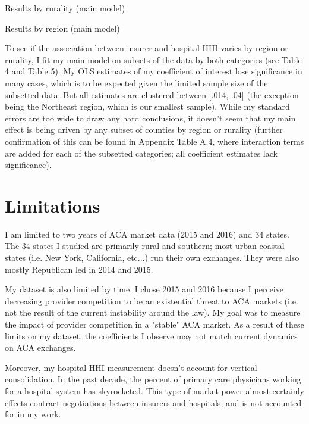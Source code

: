 \documentclass[12pt,letterpaper]{article}
\begin{document}

\begin{table}
\centering
\caption{Results by rurality (main model)}

\end{table}

\begin{table}
\centering
\caption{Results by region (main model)}

\end{table}

\restoregeometry

To see if the association between insurer and hospital HHI varies by region or rurality, I fit my main model on subsets of the data by both categories (see Table 4 and Table 5). My OLS estimates of my coefficient of interest lose significance in many cases, which is to be expected given the limited sample size of the subsetted data. But all estimates are clustered between [.014, .04] (the exception being the Northeast region, which is our smallest sample). While my standard errors are too wide to draw any hard conclusions, it doesn't seem that my main effect is being driven by any subset of counties by region or rurality (further confirmation of this can be found in Appendix Table A.4, where interaction terms are added for each of the subsetted categories; all coefficient estimates lack significance).   

\section{Limitations}

I am limited to two years of ACA market data (2015 and 2016) and 34 states. The 34 states I studied are primarily rural and southern; most urban coastal states (i.e. New York, California, etc...) run their own exchanges. They were also mostly Republican led in 2014 and 2015. 

My dataset is also limited by time. I chose 2015 and 2016 because I perceive decreasing provider competition to be an existential threat to ACA markets (i.e. not the result of the current instability around the law). My goal was to measure the impact of provider competition in a "stable" ACA market. As a result of these limits on my dataset, the coefficients I observe may not match current dynamics on ACA exchanges. 

Moreover, my hospital HHI measurement doesn't account for vertical consolidation. In the past decade, the percent of primary care physicians working for a hospital system has skyrocketed. This type of market power almost certainly effects contract negotiations between insurers and hospitals, and is not accounted for in my work.
\end{document}
